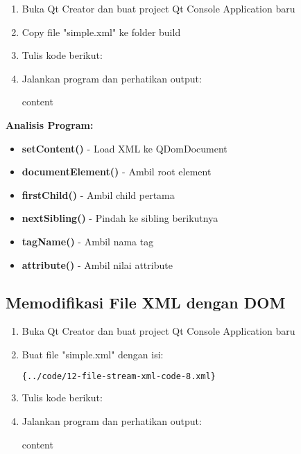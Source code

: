 \begin{enumerate}
\item Buka Qt Creator dan buat project Qt Console Application baru
\item Copy file "simple.xml" ke folder build
\item Tulis kode berikut:



\item Jalankan program dan perhatikan output:

\begin{lcverbatim}
content
\end{lcverbatim}
\end{enumerate}

\textbf{Analisis Program:}
\begin{itemize}
\item \textbf{setContent()} - Load XML ke QDomDocument
\item \textbf{documentElement()} - Ambil root element
\item \textbf{firstChild()} - Ambil child pertama
\item \textbf{nextSibling()} - Pindah ke sibling berikutnya
\item \textbf{tagName()} - Ambil nama tag
\item \textbf{attribute()} - Ambil nilai attribute
\end{itemize}

\subsection{Memodifikasi File XML dengan DOM}

\begin{enumerate}
\item Buka Qt Creator dan buat project Qt Console Application baru
\item Buat file "simple.xml" dengan isi:

\begin{lstlisting}[language=xml]{../code/12-file-stream-xml-code-8.xml}
\end{lstlisting}

\item Tulis kode berikut:



\item Jalankan program dan perhatikan output:

\begin{lcverbatim}
content
\end{lcverbatim}
\end{enumerate}

